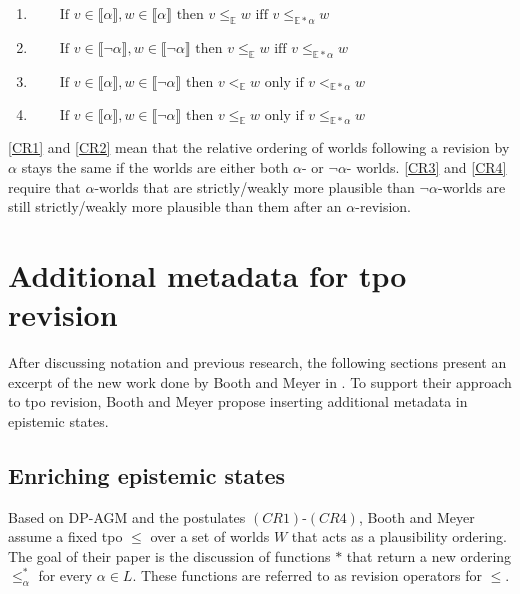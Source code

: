 \documentclass[english, 12pt]{scrartcl}
\theoremstyle{definition}
\theoremstyle{definition}
\theoremstyle{definition}
\newcommand{\modelsOf}[1]{\llbracket #1 \rrbracket}
\begin{document}
\begin{enumerate}[wide=0pt, widest=99,leftmargin=\parindent,label = (CR$\arabic*$)]
    \item\label{CR1} $\qquad \textrm{If } v\in \modelsOf{\alpha}, w \in \modelsOf{\alpha} \textrm{ then } v \leq_{\mathbb{E}} w \textrm{ iff } v \leq_{\mathbb{E\ast\alpha}} w$
    \item\label{CR2} $\qquad \textrm{If } v\in \modelsOf{\neg\alpha}, w \in \modelsOf{\neg\alpha} \textrm{ then } v \leq_{\mathbb{E}} w \textrm{ iff } v \leq_{\mathbb{E\ast\alpha}} w$
    \item\label{CR3} $\qquad \textrm{If } v\in \modelsOf{\alpha}, w \in \modelsOf{\neg\alpha} \textrm{ then } v <_{\mathbb{E}} w \textrm{ only if } v <_{\mathbb{E\ast\alpha}} w$
    \item\label{CR4} $\qquad \textrm{If } v\in \modelsOf{\alpha}, w \in \modelsOf{\neg\alpha} \textrm{ then } v \leq_{\mathbb{E}} w \textrm{ only if } v \leq_{\mathbb{E\ast\alpha}} w$
\end{enumerate}

\ref{CR1} and \ref{CR2} mean that the relative ordering of worlds following a revision by $\alpha$ stays the same if the worlds are either both $\alpha$- or $\neg\alpha$- worlds. \ref{CR3} and \ref{CR4} require that $\alpha$-worlds that are strictly/weakly more plausible than $\neg\alpha$-worlds are still strictly/weakly more plausible than them after an $\alpha$-revision.

\section{Additional metadata for tpo revision}
After discussing notation and previous research, the following sections present an excerpt of the new work done by Booth and Meyer in \cite{Booth2011}. To support their approach to tpo revision, Booth and Meyer propose inserting additional metadata in epistemic states. 

\subsection{Enriching epistemic states}
Based on DP-AGM and the postulates $(CR1)$-$(CR4)$, Booth and Meyer assume a fixed tpo $\leq$ over a set of worlds $W$ that acts as a plausibility ordering. The goal of their paper is the discussion of functions $\ast$ that return a new ordering $\leq_{\alpha}^{\ast}$ for every $\alpha \in L$. These functions are referred to as revision operators for $\leq$.
\end{document}
